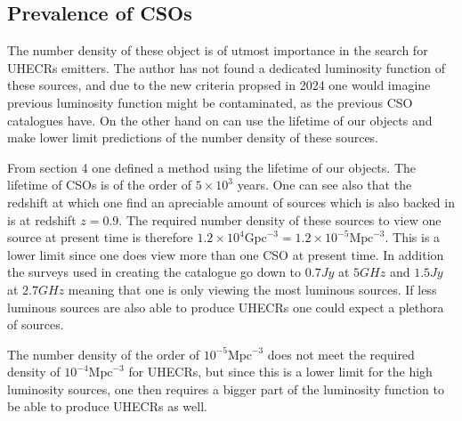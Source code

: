\subsection{Prevalence of CSOs}

The number density of these object is of utmost importance in the search for UHECRs emitters. The author has not found a dedicated luminosity function of these sources, and due to the new criteria propsed in 2024 one would imagine previous luminosity function might be contaminated, as the previous CSO catalogues have. On the other hand on can use the lifetime of our objects and make lower limit predictions of the number density of these sources.

From section 4 one defined a method using the lifetime of our objects. The lifetime of CSOs is of the order of $5 \times 10^3$ years. One can see also that the redshift at which one find an apreciable amount of sources which is also backed in \cite{kiehlmann2023compact2} is at redshift $z=0.9$. The required number density of these sources to view one source at present time is therefore $1.2 \times 10^{4} \text{Gpc}^{-3} = 1.2 \times 10^{-5} \text{Mpc}^{-3}$. This is a lower limit since one does view more than one CSO at present time. In addition the surveys used in creating the catalogue go down to $0.7 Jy$ at $5 GHz$ and $1.5 Jy$ at $2.7 GHz$ meaning that one is only viewing the most luminous sources. If less luminous sources are also able to produce UHECRs one could expect a plethora of sources. 

The number density of the order of $10^{-5} \text{Mpc}^{-3}$ does not meet the required density of $10^{-4} \text{Mpc}^{-3}$ for UHECRs, but since this is a lower limit for the high luminosity sources, one then requires a bigger part of the luminosity function to be able to produce UHECRs as well.   






